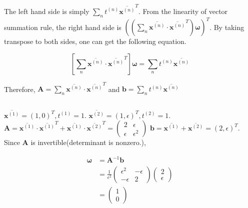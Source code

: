 \documentclass[12pt]{article}
\begin{document}
The left hand side is simply $\sum_n t^{(n)}\overline{\boldsymbol{x}^{(n)}}^T$. From the linearity of vector summation rule, the right hand side is $\left(\left(\sum_n \overline{\boldsymbol{x}^{(n)}} \cdot \overline{\boldsymbol{x}^{(n)}}^T\right)\boldsymbol{\omega}\right)^T$.
By taking transpose to both sides, one can get the following equation.

\begin{equation}
    \left[\sum_n \overline{\boldsymbol{x}^{(n)}} \cdot \overline{\boldsymbol{x}^{(n)}}^T\right] \boldsymbol{\omega} = \sum_n t^{(n)}\overline{\boldsymbol{x}^{(n)}}
\end{equation}

Therefore, $\boldsymbol{A} = \sum_n \overline{\boldsymbol{x}^{(n)}} \cdot \overline{\boldsymbol{x}^{(n)}}^T$ and $\boldsymbol{b} = \sum_n t^{(n)} \overline{\boldsymbol{x}^{(n)}}$

\subsection{}
$\overline{\boldsymbol{x}^{(1)}} = (1,0)^T, t^{(1)} = 1.$ $\overline{\boldsymbol{x}^{(2)}} = (1,\epsilon)^T, t^{(2)} = 1.$ 
$\boldsymbol{A} = \overline{\boldsymbol{x}^{(1)}} \cdot \overline{\boldsymbol{x}^{(1)}}^T + \overline{\boldsymbol{x}^{(1)}} \cdot \overline{\boldsymbol{x}^{(2)}}^T = \begin{pmatrix}
2 & \epsilon \\ \epsilon & \epsilon^2
\end{pmatrix}$
$\boldsymbol{b} = \overline{\boldsymbol{x}^{(1)}} + \overline{\boldsymbol{x}^{(2)}} = (2,\epsilon)^T$. Since $\boldsymbol{A}$ is invertible(determinant is nonzero.), 

\begin{align}
    \boldsymbol{\omega} &= \boldsymbol{A}^{-1}\boldsymbol{b} \\ &= \frac{1}{\epsilon^2} \begin{pmatrix}
        \epsilon^2 & -\epsilon \\ -\epsilon & 2
        \end{pmatrix} \begin{pmatrix} 2 \\ \epsilon \end{pmatrix} \\ &= \begin{pmatrix} 1 \\ 0 \end{pmatrix}
\end{align}
\end{document}
